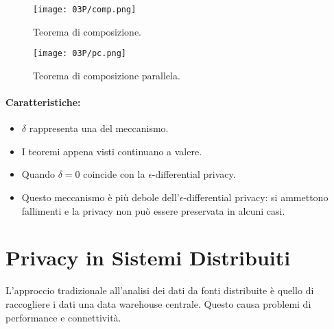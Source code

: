 \begin{figure}[h]
    \centering
    \texttt{[image: 03P/comp.png]}
    \caption{Teorema di composizione.}
\end{figure}


\begin{figure}[h]
    \centering
    \texttt{[image: 03P/pc.png]}
    \caption{Teorema di composizione parallela.}
\end{figure}


\paragraph{Caratteristiche:}

\begin{itemize}
  \item $\delta$ rappresenta una  del meccanismo. 
  \item I teoremi appena visti continuano a valere. 
  \item Quando $\delta = 0$ coincide con la $\epsilon$-differential privacy. 
  \item Questo meccanismo è più debole dell'$\epsilon$-differential privacy: si ammettono fallimenti e la privacy non può essere preservata in alcuni casi.
\end{itemize}


\section{Privacy in Sistemi Distribuiti}

L'approccio tradizionale all'analisi dei dati da fonti distribuite è quello di raccogliere i dati una data warehouse centrale. Questo causa problemi di performance e connettività.


